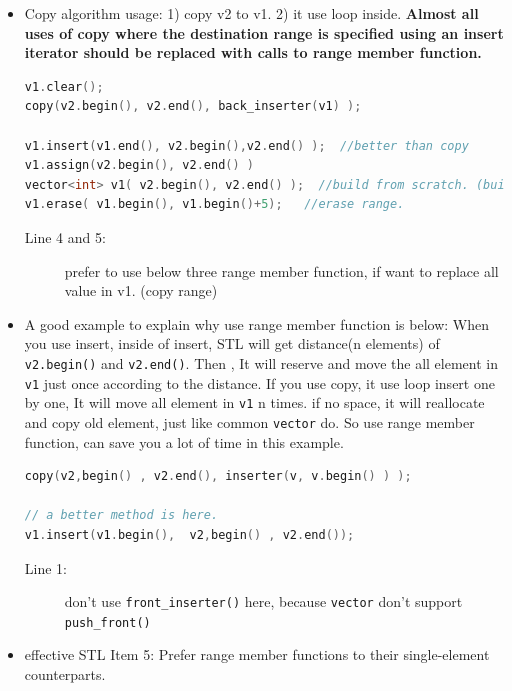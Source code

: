 \documentclass[a4paper,11pt,twoside]{book}
\begin{document}
\begin{itemize}

\item Copy algorithm usage: 1) copy v2 to v1.  2) it use loop inside.  \textbf{Almost all uses of copy where the destination range is specified using an insert iterator should be replaced with calls to range member function.}

\begin{lstlisting}[frame=single, language=c++]
v1.clear();
copy(v2.begin(), v2.end(), back_inserter(v1) );

v1.insert(v1.end(), v2.begin(),v2.end() );  //better than copy
v1.assign(v2.begin(), v2.end() )
vector<int> v1( v2.begin(), v2.end() );  //build from scratch. (build range)
v1.erase( v1.begin(), v1.begin()+5);   //erase range.
\end{lstlisting}
\begin{description}
	\item[Line 4 and 5:] prefer to use below three range member function, if want to replace all value in v1. (copy range)
\end{description}

	\item A good example to explain why use range member function is below: When you use insert, inside of insert,  STL will get distance(n elements) of \texttt{v2.begin()} and \texttt{v2.end()}. Then , It will reserve and move the all element in \texttt{v1} just once according to the distance.  If you use copy, it use loop insert one by one, It will move all element in \texttt{v1} n times. if no space, it will reallocate and copy old element, just like common \texttt{vector} do. So use range member function, can save you a lot of time in this example.

\begin{lstlisting}[frame=single, language=c++]
copy(v2,begin() , v2.end(), inserter(v, v.begin() ) );

// a better method is here.
v1.insert(v1.begin(),  v2,begin() , v2.end());
\end{lstlisting}
\begin{description}
	\item[Line 1:] don't use \texttt{front\_inserter()} here, because \texttt{vector} don't support \texttt{push\_front()}
\end{description}

\item effective STL Item 5: Prefer range member functions to their single-element counterparts.


\end{itemize}
\end{document}
